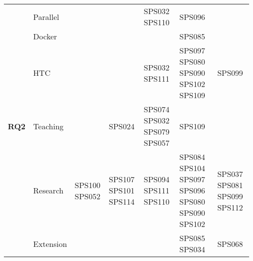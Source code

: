 \begin{table*}[htbp]
\begin{tabularx}{\textwidth}{p{0.8cm}p{2.5cm}>{\raggedright\arraybackslash}X>{\raggedright\arraybackslash}X>{\raggedright\arraybackslash}X>{\raggedright\arraybackslash}X>{\raggedright\arraybackslash}X}
		\addlinespace[0.3em]
		                                      & Parallel                &  			 			&                 		& SPS032 SPS110        			& SPS096											&             		 			\\
		\addlinespace[0.3em]
		                                      & Docker                  &        			 	&                    	&                    			& SPS085											&                    			\\
		\addlinespace[0.3em]
		                                      & HTC                     &  						&         				& SPS032 SPS111					& SPS097 SPS080 SPS090 SPS102 SPS109   				& SPS099                		\\
		\midrule
		\multirow{0}{*}[1.2em]{\textbf{RQ2}}  & Teaching                &        			 	& SPS024                & SPS074 SPS032 SPS079 SPS057   & SPS109 											&            		 			\\
		\addlinespace[0.3em]
											  & Research                & SPS100 SPS052      	& SPS107 SPS101 SPS114 	& SPS094 SPS111 SPS110  		& SPS084 SPS104	SPS097 SPS096 SPS080 SPS090 SPS102	& SPS037 SPS081 SPS099 SPS112   \\
		\addlinespace[0.3em]
											  & Extension               &        			 	&                    	&              					& SPS085 SPS034 									& SPS068           		 		\\
		\bottomrule
	\end{tabularx}
\end{table*}
